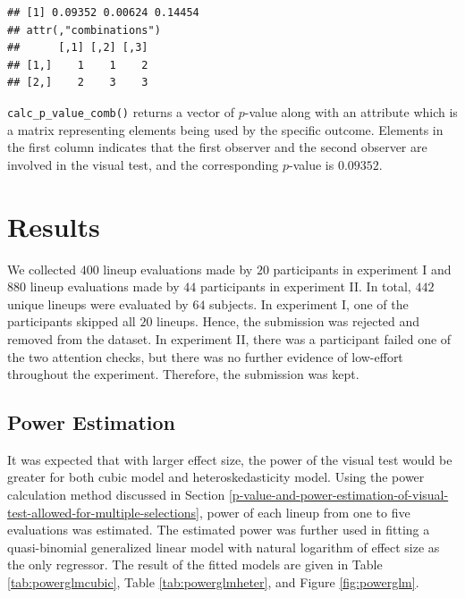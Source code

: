 \documentclass{monashthesis}
\theoremstyle{definition}
\theoremstyle{definition}
\theoremstyle{definition}
\theoremstyle{definition}
\theoremstyle{remark}
\begin{document}
\begin{Shaded}
\begin{Highlighting}[]
\NormalTok{(} \NormalTok{(}\NormalTok{, }\NormalTok{, }\NormalTok{), }
                   \NormalTok{, }
                   \NormalTok{(}\NormalTok{, }\NormalTok{, }\NormalTok{))}
\end{Highlighting}
\end{Shaded}

\begin{verbatim}
## [1] 0.09352 0.00624 0.14454
## attr(,"combinations")
##      [,1] [,2] [,3]
## [1,]    1    1    2
## [2,]    2    3    3
\end{verbatim}

\texttt{calc\_p\_value\_comb()} returns a vector of \(p\)-value along with an attribute which is a matrix representing elements being used by the specific outcome. Elements in the first column indicates that the first observer and the second observer are involved in the visual test, and the corresponding \(p\)-value is \(0.09352\).

\hypertarget{results}{%
\section{Results}\label{results}}

We collected \(400\) lineup evaluations made by \(20\) participants in experiment I and \(880\) lineup evaluations made by \(44\) participants in experiment II. In total, \(442\) unique lineups were evaluated by \(64\) subjects. In experiment I, one of the participants skipped all \(20\) lineups. Hence, the submission was rejected and removed from the dataset. In experiment II, there was a participant failed one of the two attention checks, but there was no further evidence of low-effort throughout the experiment. Therefore, the submission was kept.

\hypertarget{power-estimation}{%
\subsection{Power Estimation}\label{power-estimation}}

It was expected that with larger effect size, the power of the visual test would be greater for both cubic model and heteroskedasticity model. Using the power calculation method discussed in Section \ref{p-value-and-power-estimation-of-visual-test-allowed-for-multiple-selections}, power of each lineup from one to five evaluations was estimated. The estimated power was further used in fitting a quasi-binomial generalized linear model with natural logarithm of effect size as the only regressor. The result of the fitted models are given in Table \ref{tab:powerglmcubic}, Table \ref{tab:powerglmheter}, and Figure \ref{fig:powerglm}.
\end{document}
